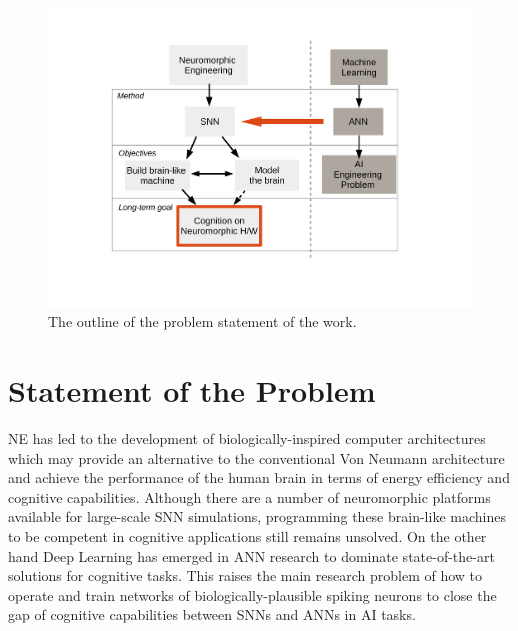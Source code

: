 \begin{figure}[tbh!]
	\centering
	\includegraphics[width=1.0\textwidth]{pics_intro/intro2.pdf}
	\caption{
		The outline of the problem statement of the work.
	}
	\label{fig:intro}
\end{figure}




\section{Statement of the Problem}
\label{sec:state_problem}
NE has led to the development of biologically-inspired computer architectures which may provide an alternative to the conventional Von Neumann architecture and achieve the performance of the human brain in terms of energy efficiency and cognitive capabilities.
Although there are a number of neuromorphic platforms available for large-scale SNN simulations, programming these brain-like machines to be competent in cognitive applications still remains unsolved.
On the other hand Deep Learning has emerged in ANN research to dominate state-of-the-art solutions for cognitive tasks.
This raises the main research problem of how to operate and train networks of biologically-plausible spiking neurons to close the gap of cognitive capabilities between SNNs and ANNs in AI tasks.



